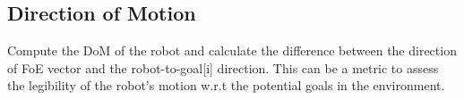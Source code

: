 

\subsection{Direction of Motion}


    Compute the DoM of the robot and calculate the difference between the direction of FoE vector and the robot-to-goal[i] direction.  This can be a metric to assess the legibility of the robot's motion w.r.t the potential goals in the environment.




